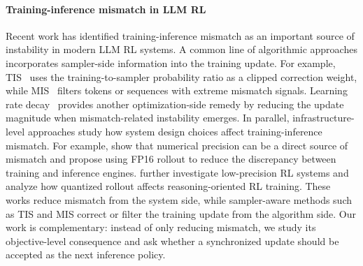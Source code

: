 \paragraph{Training-inference mismatch in LLM RL}
Recent work has identified training-inference mismatch as an important source of instability in modern LLM RL systems.
A common line of algorithmic approaches incorporates sampler-side information into the training update.
For example, TIS~\citep{mismatch1} uses the training-to-sampler probability ratio as a clipped correction weight, while MIS~\citep{mismatch2} filters tokens or sequences with extreme mismatch signals.
Learning rate decay~\citep{lrdecay} provides another optimization-side remedy by reducing the update magnitude when mismatch-related instability emerges.
In parallel, infrastructure-level approaches study how system design choices affect training-inference mismatch. 
For example, \citet{fp16} show that numerical precision can be a direct source of mismatch and propose using FP16 rollout to reduce the discrepancy between training and inference engines. 
\citet{li2026qurl} further investigate low-precision RL systems and analyze how quantized rollout affects reasoning-oriented RL training. 
These works reduce mismatch from the system side, while sampler-aware methods such as TIS and MIS correct or filter the training update from the algorithm side. 
Our work is complementary: instead of only reducing mismatch, we study its objective-level consequence and ask whether a synchronized update should be accepted as the next inference policy.
